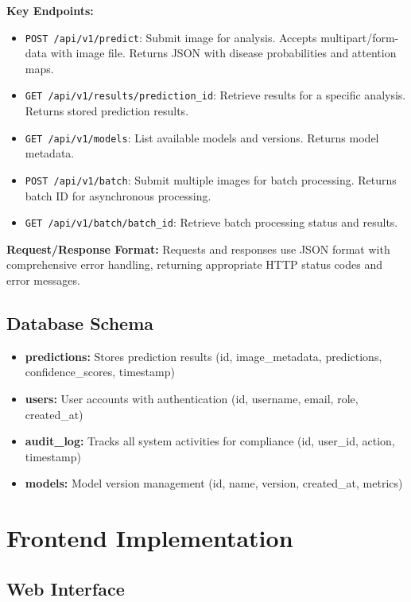 {\textbf{Key Endpoints:}

\begin{itemize}
    \item \texttt{POST /api/v1/predict}: Submit image for analysis. Accepts multipart/form-data with image file. Returns JSON with disease probabilities and attention maps.
    \item \texttt{GET /api/v1/results/{prediction\_id}}: Retrieve results for a specific analysis. Returns stored prediction results.
    \item \texttt{GET /api/v1/models}: List available models and versions. Returns model metadata.
    \item \texttt{POST /api/v1/batch}: Submit multiple images for batch processing. Returns batch ID for asynchronous processing.
    \item \texttt{GET /api/v1/batch/{batch\_id}}: Retrieve batch processing status and results.
\end{itemize}

\textbf{Request/Response Format:}
Requests and responses use JSON format with comprehensive error handling, returning appropriate HTTP status codes and error messages.

\subsection{Database Schema}

\begin{itemize}
    \item \textbf{predictions:} Stores prediction results (id, image_metadata, predictions, confidence_scores, timestamp)
    \item \textbf{users:} User accounts with authentication (id, username, email, role, created_at)
    \item \textbf{audit\_log:} Tracks all system activities for compliance (id, user_id, action, timestamp)
    \item \textbf{models:} Model version management (id, name, version, created_at, metrics)
\end{itemize}

\section{Frontend Implementation}

\subsection{Web Interface}

}
